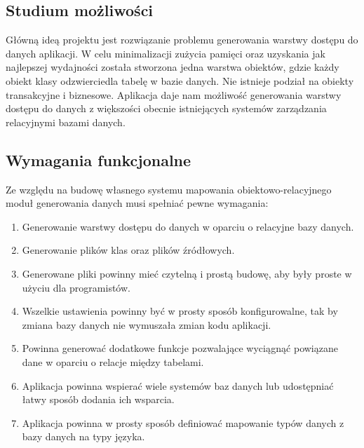 \documentclass[12pt]{report}
\begin{document}
\subsection{Studium możliwości}
	\indent Główną ideą projektu jest rozwiązanie problemu generowania warstwy dostępu do danych aplikacji. W celu minimalizacji zużycia pamięci oraz uzyskania jak najlepszej wydajności została stworzona jedna warstwa obiektów, gdzie każdy obiekt klasy odzwierciedla tabelę w bazie danych. Nie istnieje podział na obiekty transakcyjne i biznesowe. Aplikacja daje nam możliwość generowania warstwy dostępu do danych z większości obecnie istniejących systemów zarządzania relacyjnymi bazami danych.
\subsection{Wymagania funkcjonalne}
	\indent Ze względu na budowę własnego systemu mapowania obiektowo-relacyjnego moduł generowania danych musi spełniać pewne wymagania:
	\begin{enumerate}
	\item{Generowanie warstwy dostępu do danych w oparciu o relacyjne bazy danych.}
	\item{Generowanie plików klas oraz plików źródłowych.}
	\item{Generowane pliki powinny mieć czytelną i prostą budowę, aby były proste w użyciu dla programistów.}
	\item{Wszelkie ustawienia powinny być w prosty sposób konfigurowalne, tak by zmiana bazy danych nie wymuszała zmian kodu aplikacji.}
	\item{Powinna generować dodatkowe funkcje pozwalające wyciągnąć powiązane dane w oparciu o relacje między tabelami.}
	\item{Aplikacja powinna wspierać wiele systemów baz danych lub udostępniać łatwy sposób dodania ich wsparcia.}
	\item{Aplikacja powinna w prosty sposób definiować mapowanie typów danych z bazy danych na typy języka.}
	\end{enumerate}
\end{document}
